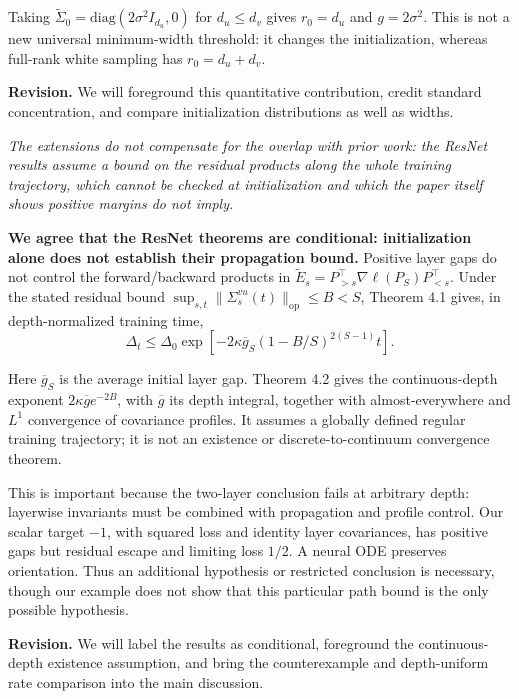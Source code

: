 \documentclass[11pt,a4paper]{article}
\renewenvironment{quote}
  {\par\addvspace{0.8em}\Needspace{8\baselineskip}%
    \list{}{\leftmargin=1.2em\rightmargin=0pt\topsep=0.25em
    \parsep=0.3em}\item\relax\normalsize\itshape\color{quotegray}}
  {\endlist\nopagebreak[4]}
\begin{document}
Taking \(\widetilde\Sigma_0=\mathrm{diag}(2\sigma^2 I_{d_u},0)\) for \(d_u\le d_v\) gives \(r_0=d_u\) and \(g=2\sigma^2\). This is not a new universal minimum-width threshold: it changes the initialization, whereas full-rank white sampling has \(r_0=d_u+d_v\).

\textbf{Revision.} We will foreground this quantitative contribution, credit standard concentration, and compare initialization distributions as well as widths.

\begin{quote}
The extensions do not compensate for the overlap with prior work: the ResNet results assume a bound on the residual products along the whole training trajectory, which cannot be checked at initialization and which the paper itself shows positive margins do not imply.
\end{quote}

\textbf{We agree that the ResNet theorems are conditional: initialization alone does not establish their propagation bound.} Positive layer gaps do not control the forward/backward products in \(\widetilde E_s=P_{>s}^\top\nabla\ell(P_S)P_{<s}^\top\). Under the stated residual bound \(\sup_{s,t}\|\Sigma_s^{vu}(t)\|_{\mathrm{op}}\le B<S\), Theorem 4.1 gives, in depth-normalized training time,
\[
\Delta_t\le\Delta_0\exp\!\left[-2\kappa\overline g_S(1-B/S)^{2(S-1)}t\right].
\]

Here \(\overline g_S\) is the average initial layer gap. Theorem 4.2 gives the continuous-depth exponent \(2\kappa\overline g e^{-2B}\), with \(\overline g\) its depth integral, together with almost-everywhere and \(L^1\) convergence of covariance profiles. It assumes a globally defined regular training trajectory; it is not an existence or discrete-to-continuum convergence theorem.

This is important because the two-layer conclusion fails at arbitrary depth: layerwise invariants must be combined with propagation and profile control. Our scalar target \(-1\), with squared loss and identity layer covariances, has positive gaps but residual escape and limiting loss \(1/2\). A neural ODE preserves orientation. Thus an additional hypothesis or restricted conclusion is necessary, though our example does not show that this particular path bound is the only possible hypothesis.

\textbf{Revision.} We will label the results as conditional, foreground the continuous-depth existence assumption, and bring the counterexample and depth-uniform rate comparison into the main discussion.
\end{document}

